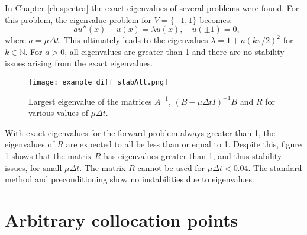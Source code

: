 \documentclass{sfuthesis}
\begin{document}
In Chapter \ref{ch:spectra} the exact eigenvalues of several problems were found.
For this problem, the eigenvalue problem for $V = \{-1, 1\}$ becomes:
\begin{equation}
-a u''(x) + u(x) = \lambda u(x), \quad u(\pm 1) = 0, 
\end{equation}
where $a = \mu \Delta t$.
This ultimately leads to the eigenvalues $\lambda = 1 + a ( k \pi /2 )^2$ for $k \in \mathbb{N}$.
For $a>0$, all eigenvalues are greater than 1 and there are no stability issues arising from the exact eigenvalues.

\begin{figure}
\texttt{[image: example\_diff\_stabAll.png]}
\caption{Largest eigenvalue of the matrices $A^{-1}$, $(B - \mu \Delta t I)^{-1} B$ and $R$ for various values of $\mu \Delta t$.}
\label{fig:stabR}
\end{figure}

With exact eigenvalues for the forward problem always greater than 1, the eigenvalues of $R$ are expected to all be less than or equal to 1.
Despite this, figure \ref{fig:stabR} shows that the matrix $R$ has eigenvalues greater than 1, and thus stability issues, for small $\mu \Delta t$.
The matrix $R$ cannot be used for $\mu \Delta t< 0.04$.
The standard method and preconditioning show no instabilities due to eigenvalues.




\chapter{Arbitrary collocation points}
\label{sec:further}
\end{document}
